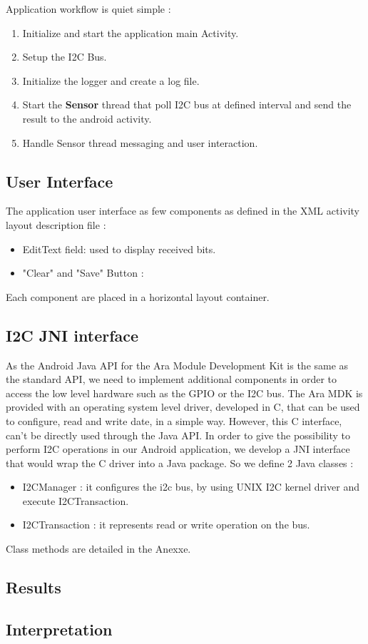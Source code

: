 Application workflow is quiet simple :
\begin{enumerate}
\item Initialize and start the application main Activity.
\item Setup the I2C Bus.
\item Initialize the logger and create a log file.
\item Start the \textbf{Sensor} thread that poll I2C bus at defined interval and send the result to the android activity. 
\item Handle Sensor thread messaging and user interaction.
\end{enumerate}

\subsection{User Interface}

The application user interface as few components as defined in the XML activity layout description file :
\begin{itemize}
\item EditText field: used to display received bits.
\item "Clear" and "Save" Button :
\end{itemize}

Each component are placed in a horizontal layout container.

\subsection{I2C JNI interface}

As the Android Java API for the Ara Module Development Kit is the same as the standard API, we need to implement additional components in order to access the low level hardware such as the GPIO or the I2C bus.
The Ara MDK is provided with an operating system level driver, developed in C, that can be used to configure, read and write date, in a simple way.
However, this C interface, can't be directly used through the Java API. In order to give the possibility to perform I2C operations in our Android application, we develop a JNI interface that would wrap the C driver into a Java package.
So we define 2 Java classes : 
\begin{itemize}
\item I2CManager : it configures the i2c bus, by using UNIX I2C kernel driver and execute I2CTransaction.
\item I2CTransaction : it represents read or write operation on the bus.
\end{itemize}

Class methods are detailed in the Anexxe.

\subsection{Results}
\subsection{Interpretation}